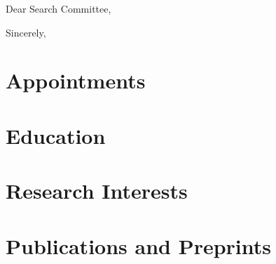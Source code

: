 \documentclass[11pt,letterpaper,serif]{moderncv} %
\newcounter{section} \setcounter{section}{1} \newtheorem{theorem}{Theorem}
\begin{document}

\date{\today}
\opening{Dear Search Committee,}
\closing{Sincerely,}

 
% 




\makecvtitle %


\section{Appointments}

\newcommand{\appointment}[6]{\cventry{#5}{#1}{#2}{#6}{}{}}


\section{Education}

\newcommand{\education}[8]{\cventry{#5}{#1}{#2}{#6}{}{#8}}


\section{Research Interests}


\section{Publications and Preprints}
\end{document}

